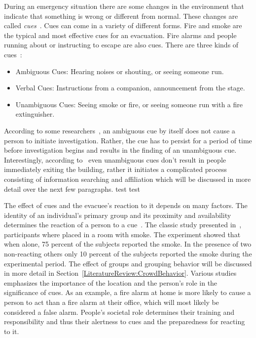 During an emergency situation there are some changes in the environment that indicate that something is wrong or different from normal. These changes are called \emph{cues}~\cite{Sime:1983uy}. Cues can come in a variety of different forms. Fire and smoke are the typical and most effective cues for an evacuation. Fire alarms and people running about or instructing to escape are also cues. There are three kinds of cues~\cite{Sime:1983uy}:
\begin{itemize}
\item Ambiguous Cues: Hearing noises or shouting, or seeing someone run.
\item Verbal Cues: Instructions from a companion, announcement from the stage.
\item Unambiguous Cues: Seeing smoke or fire, or seeing someone run with a fire extinguisher.
\end{itemize}
According to some researchers~\cite{Ramachandran:1990wj,Proulx:2007ul}, an ambiguous cue by itself does not cause a person to initiate investigation. Rather, the cue has to persist for a period of time before investigation begins and results in the finding of an unambiguous cue. Interestingly, according to~\cite{Tong:1985wn} even unambiguous cues don't result in people immediately exiting the building, rather it initiates a complicated process consisting of information searching and affiliation which will be discussed in more detail over the next few paragraphs. test test

The effect of cues and the evacuee's reaction to it depends on many factors. The identity of an individual's primary group and its proximity and availability determines the reaction of a person to a cue~\cite{Sime:1983uy}. The classic study presented in~\cite{Latane:1969wm}, participants where placed in a room with smoke. The experiment showed that when alone, 75 percent of the subjects reported the smoke. In the presence of two non-reacting others only 10 percent of the subjects reported the smoke during the experimental period. The effect of groups and grouping behavior will be discussed in more detail in Section~\ref{LiteratureReview:CrowdBehavior}. Various studies~\cite{Proulx:2003tc,Proulx:2001we,Paulsen:1984ti,Sandberg:1997tw,Cocking:2008vv,Tong:1985wn} emphasizes the importance of the location and the person's role in the significance of cues. As an example, a fire alarm at home is more likely to cause a person to act than a fire alarm at their office, which will most likely be considered a false alarm. People's societal role determines their training and responsibility and thus their alertness to cues and the preparedness for reacting to it.

